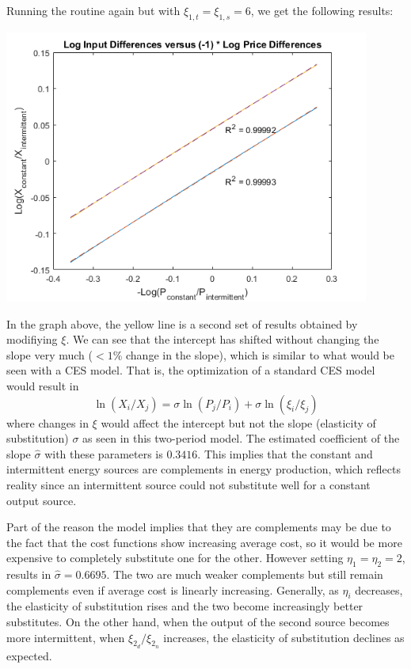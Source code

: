 \documentclass[12pt,a4paper]{extarticle}
\begin{document}
Running the routine again but with $\xi_{1,t} =  \xi_{1,s} = 6$, we get the following results: 

\begin{center}
	\includegraphics[width=0.9\textwidth]{exhibits/model_v1_ex2.png} 
\end{center}


In the graph above, the yellow line is a second set of results obtained by modifiying $\xi$. We can see that the intercept has shifted without changing the slope very much ($<1\%$ change in the slope), which is similar to what would be seen with a CES model. That is, the optimization of a standard CES model would result in 
$$\ln(X_i/ X_j) = \sigma \ln(P_j / P_i) + \sigma \ln(\xi_i/ \xi_j)$$
where changes in $\xi$ would affect the intercept but not the slope (elasticity of substitution) $\sigma$ as seen in this two-period model. The estimated coefficient of the slope $\hat{\sigma}$ with these parameters is $0.3416$. This implies that the constant and intermittent energy sources are complements in energy production, which reflects reality since an intermittent source could not substitute well for a constant output source. 

Part of the reason the model implies that they are complements may be due to the fact that the cost functions show increasing average cost, so it would be more expensive to completely substitute one for the other. However setting $\eta_1 = \eta_2 = 2$, results in $\hat{\sigma} = 0.6695$. The two are much weaker complements but still remain complements even if average cost is linearly increasing. Generally, as $\eta_i$ decreases, the elasticity of substitution rises and the two become increasingly better substitutes. On the other hand, when the output of the second source becomes more intermittent, when $\xi_{2_d} / \xi_{2_n}$ increases, the elasticity of substitution declines as expected. 
\end{document}
